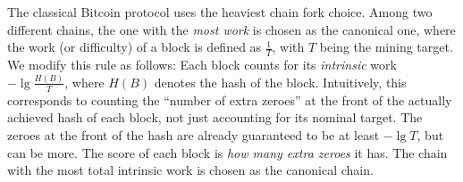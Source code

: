 \noindent
{}
The classical Bitcoin protocol uses the heaviest chain fork choice. Among two different
chains, the one with the \emph{most work} is chosen as the canonical one, where the work (or difficulty) of a block
is defined as $\frac{1}{T}$, with $T$ being the mining target. We modify this
rule as follows: Each block counts for its \emph{intrinsic} work $-\lg \frac{H(B)}{T}$,
where $H(B)$ denotes the hash of the block. Intuitively, this corresponds to counting the
``number of extra zeroes'' at the front of the actually achieved hash of each block, not just accounting
for its nominal target. The zeroes at the front of the hash are already guaranteed
to be at least $-\lg T$, but can be more. The score of each block is \emph{how many extra zeroes}
it has. The chain with the most total intrinsic work is chosen as the canonical chain.

